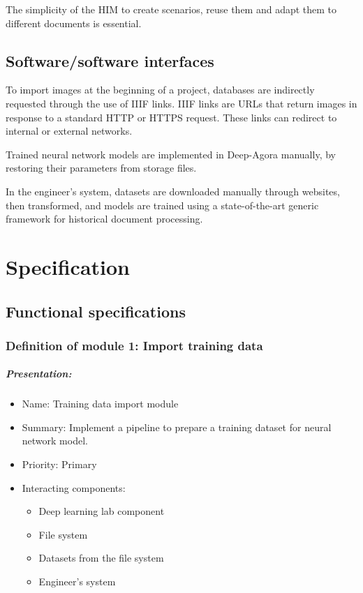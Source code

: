 \documentclass{polytech/polytech}
\numberwithin{figure}{chapter}
\begin{document}
\begin{appendix}
The simplicity of the HIM to create scenarios, reuse them and adapt them to different documents is essential.


\section{Software/software interfaces}

To import images at the beginning of a project, databases are indirectly requested through the use of IIIF links.
IIIF links are URLs that return images in response to a standard HTTP or HTTPS request.
These links can redirect to internal or external networks.

Trained neural network models are implemented in Deep-Agora manually, by restoring their parameters from storage files.

In the engineer’s system, datasets are downloaded manually through websites, then transformed, and models are trained using a state-of-the-art generic framework for historical document processing.



\chapter{Specification}

\section{Functional specifications}

\subsection{Definition of module 1: Import training data}

\paragraph{Presentation:}
 
\begin{itemize}
    \item Name: Training data import module
    \item Summary: Implement a pipeline to prepare a training dataset for neural network model.
    \item Priority: Primary
    \item Interacting components:
    \begin{itemize}
        \item Deep learning lab component
        \item File system
        \item Datasets from the file system
        \item Engineer’s system
    \end{itemize}
\end{itemize}


\end{appendix}
\end{document}
